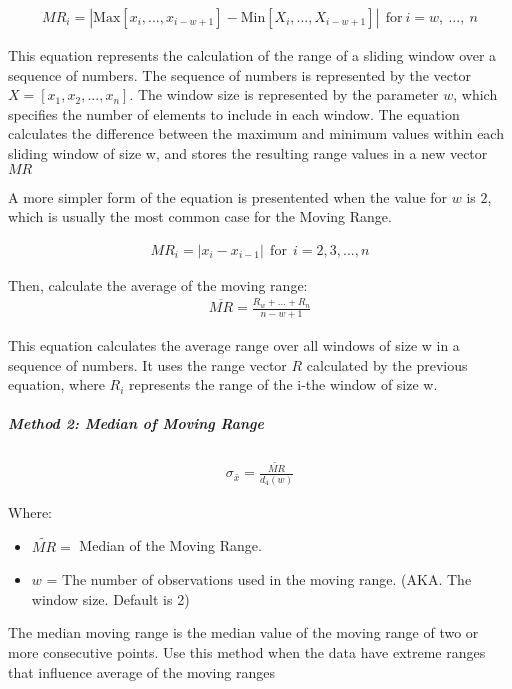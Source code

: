 \documentclass[11pt]{article}
\begin{document}
\begin{gather}
  MR_i = | \text{Max}[x_{i}, ...,  x_{i-w+1}] - \text{Min}[X_i, ..., X_{i-w+1}]| \ \ \text{for} \ i=w, \ ..., \ n
\end{gather}

This equation represents the calculation of the range of a sliding
window over a sequence of numbers. The sequence of numbers is
represented by the vector \(X = [x_1, x_2, ..., x_n]\). The window size is
represented by the parameter \(w\), which specifies the number of
elements to include in each window. The equation calculates the
difference between the maximum and minimum values within each sliding
window of size w, and stores the resulting range values in a new vector
\(MR\)

A more simpler form of the equation is presentented when the value for \(w\) is \(2\), which
is usually the most common case for the Moving Range. 

\begin{gather}
  MR_i = |x_i - x_{i-1}| \ \ \text{for} \ \ i=2,3,..., n
\end{gather}


Then, calculate the average of the moving range:
\begin{gather}
   \overline{MR} = \frac{R_w + ... + R_n}{n-w+1}  
\end{gather}


This equation calculates the average range over all windows of size w in
a sequence of numbers. It uses the range vector \(R\) calculated by the
previous equation, where \(R_i\) represents the range of the i-the window
of size w.

\hypertarget{median-moving-range}{%
\subparagraph{Method 2: Median of Moving Range}\label{median-moving-range}}

\begin{gather}
  \sigma_{\bar x} = \frac{\widetilde{MR}}{d_4(w)}  
\end{gather}

Where: 
\begin{itemize}
  \item \(\widetilde{MR} =\) Median of the Moving Range. 
  \item \(w\) =  The number of observations used in the moving range. (AKA. The window size. Default is 2) 
\end{itemize}

The median moving range is the median value of the moving range of two
or more consecutive points. Use this method when the data have extreme
ranges that influence average of the moving ranges
\end{document}
